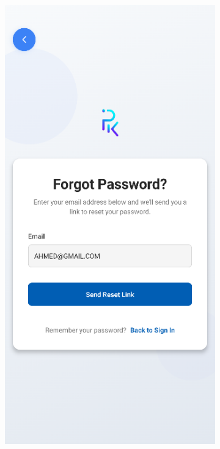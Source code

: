 \begin{figure}[htbp]
    \vspace{0.5cm} %
    
    \begin{subfigure}[b]{0.24\textwidth}
        \centering
        \includegraphics[width=\textwidth]{images/mobile-auth-screen_forgetpassword.png}

\end{subfigure}
\end{figure}
